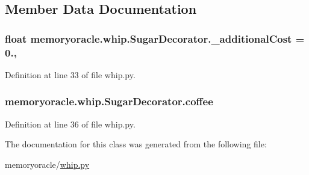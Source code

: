 \subsection{Member Data Documentation}
\hypertarget{classmemoryoracle_1_1whip_1_1SugarDecorator_a9772a7d97c73452d57a152a5fe1e192e}{}
\subsubsection[{\+\_\+additional\+Cost}]{\setlength{\rightskip}{0pt plus 5cm}float memoryoracle.\+whip.\+Sugar\+Decorator.\+\_\+additional\+Cost = 0.\hspace{0.3cm}{\ttfamily [static]}, {\ttfamily [private]}}\label{classmemoryoracle_1_1whip_1_1SugarDecorator_a9772a7d97c73452d57a152a5fe1e192e}


Definition at line 33 of file whip.\+py.

\hypertarget{classmemoryoracle_1_1whip_1_1SugarDecorator_a01b5aa427d88f7520053a5ff67ef126d}{}
\subsubsection[{coffee}]{\setlength{\rightskip}{0pt plus 5cm}memoryoracle.\+whip.\+Sugar\+Decorator.\+coffee}\label{classmemoryoracle_1_1whip_1_1SugarDecorator_a01b5aa427d88f7520053a5ff67ef126d}


Definition at line 36 of file whip.\+py.



The documentation for this class was generated from the following file\+:\begin{DoxyCompactItemize}
\item 
memoryoracle/\hyperlink{whip_8py}{whip.\+py}\end{DoxyCompactItemize}

